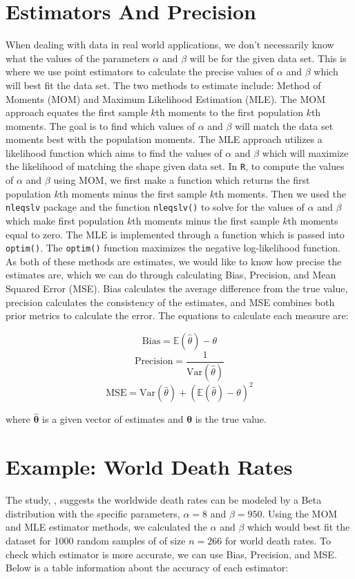 \documentclass{article}\usepackage[]{graphicx}\usepackage[]{xcolor}
\begin{document}
\begin{multicols}{2}
\section{Estimators And Precision}
When dealing with data in real world applications, we don't necessarily know what the values of the parameters $\alpha$ and $\beta$ will be for the given data set. This is where we use point estimators to calculate the precise values of $\alpha$ and $\beta$ which will best fit the data set. The two methods to estimate include: Method of Moments (MOM) and Maximum Likelihood Estimation (MLE). The MOM approach equates the first sample $k$th moments to the first population $k$th moments. The goal is to find which values of $\alpha$ and $\beta$ will match the data set moments best with the population moments. The MLE approach utilizes a likelihood function which aims to find the values of $\alpha$ and $\beta$ which will maximize the likelihood of matching the shape given data set. In \texttt{R}, to compute the values of $\alpha$ and $\beta$ using MOM, we first make a function which returns the first population $k$th moments minus the first sample $k$th moments. Then we used the \texttt{nleqslv} package \citep{nleqslv} and the function \verb|nleqslv()| to solve for the values of $\alpha$ and $\beta$ which make first population $k$th moments minus the first sample $k$th moments equal to zero. The MLE is implemented through a function which is passed into \verb|optim()|. The \verb|optim()| function maximizes the negative log-likelihood function. As both of these methods are estimates, we would like to know how precise the estimates are, which we can do through calculating Bias, Precision, and Mean Squared Error (MSE). Bias calculates the average difference from the true value, precision calculates the consistency of the estimates, and MSE combines both prior metrics to calculate the error. The equations to calculate each measure are:

\[\text{Bias} = \mathbb{E}(\hat{\theta}) - \theta\]
\[\text{Precision} = \frac{1}{\text{Var}(\hat{\theta})}\]
\[\text{MSE} = \text{Var}(\hat{\theta}) + \left( \mathbb{E}(\hat{\theta}) - \theta \right)^2\]

\noindent where $\boldsymbol{\hat{\theta}}$ is a given vector of estimates and $\boldsymbol{\theta}$ is the true value.

\section{Example: World Death Rates}
The study, \cite{faith}, suggests the worldwide death rates can be modeled by a Beta distribution with the specific parameters, $\alpha = 8$ and $\beta = 950$. Using the MOM and MLE estimator methods, we calculated the $\alpha$ and $\beta$ which would best fit the dataset for 1000 random samples of of size $n = 266$ for world death rates. To check which estimator is more accurate, we can use Bias, Precision, and MSE. Below is a table information about the accuracy of each estimator:


\end{multicols}
\end{document}
